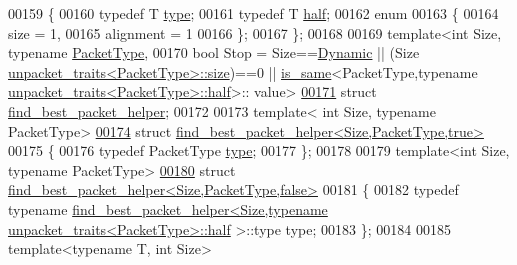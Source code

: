 \begin{DoxyCode}
00159 \{
00160   \textcolor{keyword}{typedef} T \hyperlink{union_eigen_1_1internal_1_1_packet}{type};
00161   \textcolor{keyword}{typedef} T \hyperlink{union_eigen_1_1internal_1_1_packet}{half};
00162   \textcolor{keyword}{enum}
00163   \{
00164     size = 1,
00165     alignment = 1
00166   \};
00167 \};
00168 
00169 \textcolor{keyword}{template}<\textcolor{keywordtype}{int} Size, \textcolor{keyword}{typename} \hyperlink{struct_eigen_1_1_packet_type}{PacketType},
00170          \textcolor{keywordtype}{bool} Stop = Size==\hyperlink{namespace_eigen_ad81fa7195215a0ce30017dfac309f0b2}{Dynamic} || (Size%
      \hyperlink{struct_eigen_1_1internal_1_1unpacket__traits}{unpacket\_traits<PacketType>::size})==0 || 
      \hyperlink{struct_eigen_1_1internal_1_1is__same}{is\_same}<PacketType,\textcolor{keyword}{typename} \hyperlink{union_eigen_1_1internal_1_1_packet}{unpacket\_traits<PacketType>::half}>::
      value>
\hyperlink{struct_eigen_1_1internal_1_1find__best__packet__helper}{00171} \textcolor{keyword}{struct} \hyperlink{struct_eigen_1_1internal_1_1find__best__packet__helper}{find\_best\_packet\_helper};
00172 
00173 \textcolor{keyword}{template}< \textcolor{keywordtype}{int} Size, \textcolor{keyword}{typename} PacketType>
\hyperlink{struct_eigen_1_1internal_1_1find__best__packet__helper_3_01_size_00_01_packet_type_00_01true_01_4}{00174} \textcolor{keyword}{struct }\hyperlink{struct_eigen_1_1internal_1_1find__best__packet__helper_3_01_size_00_01_packet_type_00_01true_01_4}{find\_best\_packet\_helper<Size,PacketType,true>}
00175 \{
00176   \textcolor{keyword}{typedef} PacketType \hyperlink{struct_eigen_1_1_packet_type}{type};
00177 \};
00178 
00179 \textcolor{keyword}{template}<\textcolor{keywordtype}{int} Size, \textcolor{keyword}{typename} PacketType>
\hyperlink{struct_eigen_1_1internal_1_1find__best__packet__helper_3_01_size_00_01_packet_type_00_01false_01_4}{00180} \textcolor{keyword}{struct }\hyperlink{struct_eigen_1_1internal_1_1find__best__packet__helper_3_01_size_00_01_packet_type_00_01false_01_4}{find\_best\_packet\_helper<Size,PacketType,false>}
00181 \{
00182   \textcolor{keyword}{typedef} \textcolor{keyword}{typename} 
      \hyperlink{struct_eigen_1_1internal_1_1find__best__packet__helper}{find\_best\_packet\_helper<Size,typename unpacket\_traits<PacketType>::half}
      >::type type;
00183 \};
00184 
00185 \textcolor{keyword}{template}<\textcolor{keyword}{typename} T, \textcolor{keywordtype}{int} Size>

\end{DoxyCode}
